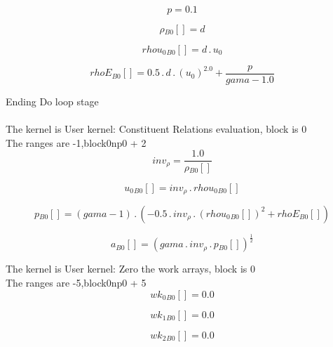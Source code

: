 \documentclass{article}
\begin{document}
\begin{dmath}p = 0.1\end{dmath}

\begin{dmath}{\rho{_{B0}}}[{}] = d\end{dmath}

\begin{dmath}{rhou_{0}{_{B0}}}[{}] = d \,.\, u_{0}\end{dmath}

\begin{dmath}{rhoE{_{B0}}}[{}] = 0.5 \,.\, d \,.\, \left(u_{0} \right)^{2.0} + \frac{p}{gama - 1.0}\end{dmath}

\noindent Ending Do loop stage\\
\\\noindent The kernel is User kernel: Constituent Relations evaluation, block is 0\\\noindent The ranges are -1,block0np0 + 2\\\begin{dmath}inv_{\rho} = \frac{1.0}{{\rho{_{B0}}}[{}]}\end{dmath}

\begin{dmath}{u_{0}{_{B0}}}[{}] = inv_{\rho} \,.\, {rhou_{0}{_{B0}}}[{}]\end{dmath}

\begin{dmath}{p{_{B0}}}[{}] = \left(gama - 1\right) \,.\, \left(- 0.5 \,.\, inv_{\rho} \,.\, \left({rhou_{0}{_{B0}}}[{}] \right)^{2} + {rhoE{_{B0}}}[{}]\right)\end{dmath}

\begin{dmath}{a{_{B0}}}[{}] = \left(gama \,.\, inv_{\rho} \,.\, {p{_{B0}}}[{}] \right)^{\frac{1}{2}}\end{dmath}

\noindent The kernel is User kernel: Zero the work arrays, block is 0\\\noindent The ranges are -5,block0np0 + 5\\\begin{dmath}{wk_{0}{_{B0}}}[{}] = 0.0\end{dmath}

\begin{dmath}{wk_{1}{_{B0}}}[{}] = 0.0\end{dmath}

\begin{dmath}{wk_{2}{_{B0}}}[{}] = 0.0\end{dmath}
\end{document}
